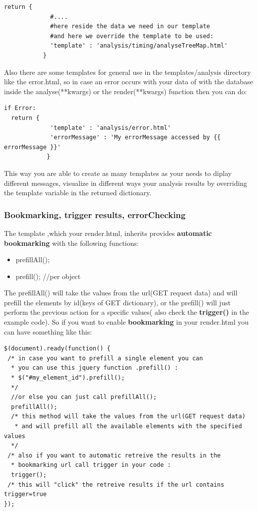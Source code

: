 \documentclass{lhcbnote}
\begin{document}
\begin{verbatim}
return {
             #....            
             #here reside the data we need in our template
             #and here we override the template to be used:
             'template' : 'analysis/timing/analyseTreeMap.html'
           }
\end{verbatim}

Also there are some templates for general use  in the templates/analysis directory like the error.html, so in case an error occurs with your data of with the database inside the analyse(**kwargs) or the render(**kwargs) function
then you can do:

\begin{verbatim}
if Error:
  return {
             'template' : 'analysis/error.html'
             'errorMessage' : 'My errorMessage accessed by {{ errorMessage }}'
            } 
\end{verbatim}

This way you are able to create as many templates as your needs to diplay different messages, visualize in different ways your analysis results 
by overriding the template variable in the returned dictionary.

\subsubsection{Bookmarking, trigger results, errorChecking}

The template ,which your render.html, inherits provides {\bf automatic bookmarking} with the following functions:

\vspace{2 mm}
\begin{itemize}
\item
prefillAll();
\item
prefill(); //per object
\end{itemize}

The prefillAll() will take the values from the url(GET request data) and will prefill the elements by id(keys of GET dictionary), or the prefill()
will just perform the previous action for a specific values( also check the {\bf trigger()} in the example code).
So if you want to enable {\bf bookmarking } in your render.html you can have something like this:

\begin{verbatim}
$(document).ready(function() {
 /* in case you want to prefill a single element you can 
  * you can use this jquery function .prefill() :
  * $("#my_element_id").prefill();
  */
  //or else you can just call prefillAll();  
  prefillAll(); 
  /* this method will take the values from the url(GET request data)
   * and will prefill all the available elements with the specified values
  */
 /* also if you want to automatic retreive the results in the 
  * bookmarking url call trigger in your code :
  trigger();
 /* this will "click" the retreive results if the url contains trigger=true
});
\end{verbatim}
\end{document}
